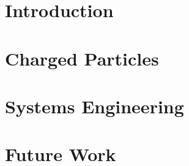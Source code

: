 \chapter{Introduction}


\chapter{Charged Particles}


\chapter{Systems Engineering}
\label{chap:systems}




\chapter{Future Work}
